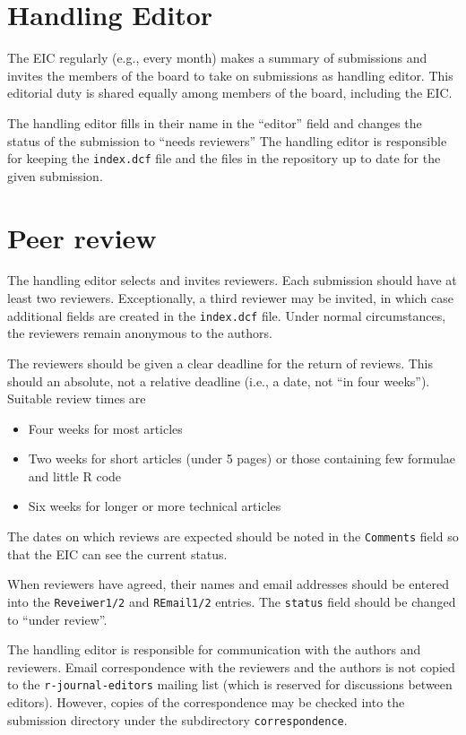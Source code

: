 \documentclass[11pt]{article}
\begin{document}
\section{Handling Editor}

The EIC regularly (e.g., every month) makes a summary of submissions
and invites the members of the board to take on submissions as
handling editor. This editorial duty is shared equally among members
of the board, including the EIC.

The handling editor fills in their name in the ``editor'' field and
changes the status of the submission to ``needs reviewers'' The
handling editor is responsible for keeping the \texttt{index.dcf} file and the
files in the repository up to date for the given submission.

\section{Peer review}

The handling editor selects and invites reviewers. Each submission
should have at least two reviewers. Exceptionally, a third reviewer
may be invited, in which case additional fields are created in the
\texttt{index.dcf} file. Under normal circumstances, the reviewers
remain anonymous to the authors.

The reviewers should be given a clear deadline for the return of
reviews.  This should an absolute, not a relative deadline (i.e., a
date, not ``in four weeks''). Suitable review times are
\begin{itemize}
\item Four weeks for most articles
\item Two weeks for short articles (under 5 pages) or those containing
few formulae and little R code
\item Six weeks for longer or more technical articles
\end{itemize}
The dates on which reviews are expected should be noted in the
\texttt{Comments} field so that the EIC can see the current status.

When reviewers have agreed, their names and email addresses should
be entered into the \verb+Reveiwer1/2+ and \verb+REmail1/2+ entries.
The \texttt{status} field should be changed to ``under review''.

The handling editor is responsible for communication with the authors
and reviewers. Email correspondence with the reviewers and the authors
is not copied to the \verb+r-journal-editors+ mailing list (which is
reserved for discussions between editors). However, copies of the
correspondence may be checked into the submission directory under the
subdirectory \texttt{correspondence}.
\end{document}
